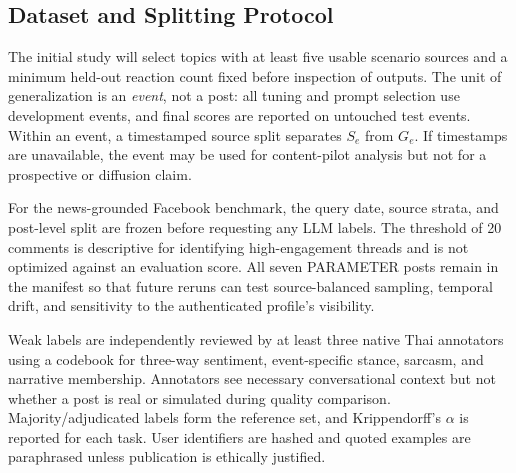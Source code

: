 \documentclass[conference]{IEEEtran}
\begin{document}
\subsection{Dataset and Splitting Protocol}

The initial study will select topics with at least five usable scenario sources
and a minimum held-out reaction count fixed before inspection of outputs. The
unit of generalization is an \emph{event}, not a post: all tuning and prompt
selection use development events, and final scores are reported on untouched
test events. Within an event, a timestamped source split separates $S_e$ from
$G_e$. If timestamps are unavailable, the event may be used for content-pilot
analysis but not for a prospective or diffusion claim.

For the news-grounded Facebook benchmark, the query date, source strata, and
post-level split are frozen before requesting any LLM labels. The threshold of
20 comments is descriptive for identifying high-engagement threads and is not
optimized against an evaluation score. All seven PARAMETER posts remain in the
manifest so that future reruns can test source-balanced sampling, temporal
drift, and sensitivity to the authenticated profile's visibility.

Weak labels are independently reviewed by at least three native Thai
annotators using a codebook for three-way sentiment, event-specific stance,
sarcasm, and narrative membership. Annotators see necessary conversational
context but not whether a post is real or simulated during quality comparison.
Majority/adjudicated labels form the reference set, and Krippendorff's
$\alpha$ is reported for each task. User identifiers are hashed and quoted
examples are paraphrased unless publication is ethically justified.
\end{document}
